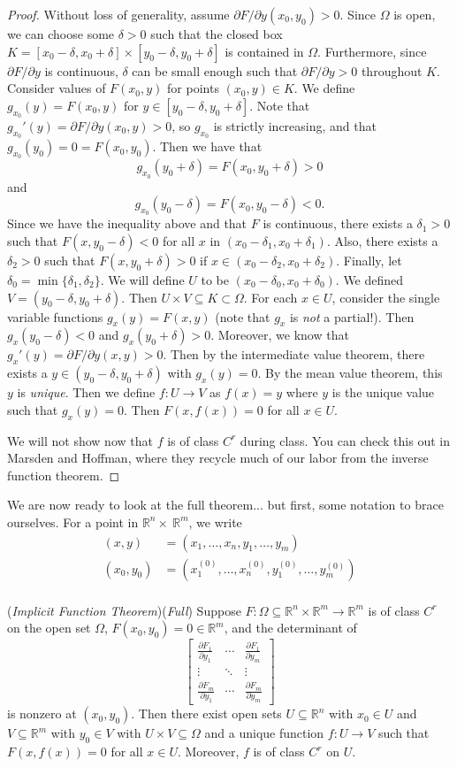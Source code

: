 \documentclass[11pt]{article}
\theoremstyle{definition}
\newcommand{\R}{\mathbb{R}}                      %
\newcommand{\mat}{\begin{bmatrix}}
\newcommand{\trix}{\end{bmatrix}}
\newcommand{\dell}{\partial}
\begin{document}
\begin{proof}
    Without loss of generality, assume $\dell F/\dell y (x_0,y_0)>0$. Since $\Omega$ is open, we can choose some $\delta>0$ such that the closed box $K=[x_0-\delta,x_0+\delta]\times [ y_0-\delta,y_0+\delta]$ is contained in $\Omega$. Furthermore, since $\dell F/ \dell y$ is continuous, $\delta$ can be small enough such that $\dell F/\dell y >0$ throughout $K$. Consider values of $F(x_0,y)$ for points $(x_0,y)\in K$. We define $g_{x_0}(y)=F(x_0,y)$ for $y\in[y_0-\delta, y_0+\delta]$. Note that $g_{x_0}'(y)=\dell F/\dell y (x_0,y)>0$, so $g_{x_0}$ is strictly increasing, and that $g_{x_0}(y_0)=0=F(x_0,y_0)$. Then we have that 
    $$
    g_{x_0}(y_0+\delta)=F(x_0,y_0+\delta)>0
    $$
    and
    $$
    g_{x_0}(y_0-\delta)=F(x_0,y_0-\delta)<0.
    $$
    Since we have the inequality above and that $F$ is continuous, there exists a $\delta_1>0$ such that $F(x,y_0-\delta)<0$ for all $x$ in $(x_0-\delta_1,x_0+\delta_1)$. Also, there exists a $\delta_2>0$ such that $F(x,y_0+\delta)>0$ if $x\in(x_0-\delta_2, x_0+\delta_2)$. Finally, let $\delta_0=\min\{\delta_1,\delta_2\}$. We will define $U$ to be $(x_0-\delta_0,x_0+\delta_0)$. We defined $V=(y_0-\delta, y_0+\delta)$. Then $U\times V\subseteq K\subset \Omega$. For each $x\in U$, consider the single variable functions $g_x(y)=F(x,y)$ (note that $g_x$ is \textit{not} a partial!). Then $g_x(y_0-\delta)<0$ and $g_x(y_0+\delta)>0$. Moreover, we know that $g_x'(y)=\dell F/\dell y (x,y)>0$. Then by the intermediate value theorem, there exists a $y\in(y_0-\delta, y_0+\delta)$ with $g_x(y)=0$. By the mean value theorem, this $y$ is \textit{unique}. Then we define $f:U\to V$ as $f(x)=y$ where $y$ is the unique value such that $g_x(y)=0$. Then $F(x,f(x))=0$ for all $x\in U$.

    We will not show now that $f$ is of class $C^r$ during class. You can check this out in Marsden and Hoffman, where they recycle much of our labor from the inverse function theorem.
\end{proof}
We are now ready to look at the full theorem... but first, some notation to brace ourselves. For a point in $\R^n\times\ \R^m$, we write
$$
\begin{aligned}
    (x,y)&=(x_1,\dots,x_n,y_1,\dots,y_m)\\
    (x_0,y_0)&=(x_1^{(0)},\dots,x_n^{(0)},y_1^{(0)},\dots,y_m^{(0)})\\
\end{aligned}
$$
\begin{shaded}
    \theorem (\textit{Implicit Function Theorem})(\textit{Full}) Suppose $F:\Omega\subseteq \R^n\times \R^m\to \R^m$ is of class $C^r$ on the open set $\Omega$, $F(x_0,y_0)=0\in \R^m$, and the determinant of
    $$
    \mat \frac{\dell F_1}{\dell y_1}&\cdots & \frac{\dell F_1}{\dell y_m}\\
    \vdots & \ddots &\vdots \\
    \frac{\dell F_m}{\dell y_1}&\cdots & \frac{\dell F_m}{\dell y_m} \trix
    $$
    is nonzero at $(x_0,y_0)$. Then there exist open sets $U\subseteq \R^n$ with $x_0\in U$ and $V\subseteq \R^m$ with $y_0\in V$ with $U\times V\subseteq \Omega$ and a unique function $f:U\to V$ such that $F(x,f(x))=0$ for all $x\in U$. Moreover, $f$ is of class $C^r$ on $U$.
\end{shaded}
\end{document}
